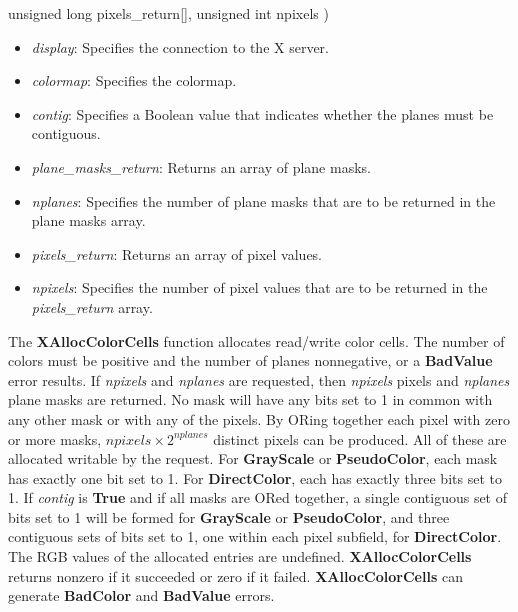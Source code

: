 \documentclass{report}
\begin{document}
\begin{itemize}
\begin{cppcode}
                    unsigned long pixels_return[],
                    unsigned int npixels
                )
            \end{cppcode}
            \bigbreak \noindent
            \begin{itemize}
                \item \textit{display}: Specifies the connection to the X server.
                \item \textit{colormap}: Specifies the colormap.
                \item \textit{contig}: Specifies a Boolean value that indicates whether the planes must be contiguous.
                \item \textit{plane\_masks\_return}: Returns an array of plane masks.
                \item \textit{nplanes}: Specifies the number of plane masks that are to be returned in the plane masks array.
                \item \textit{pixels\_return}: Returns an array of pixel values.
                \item \textit{npixels}: Specifies the number of pixel values that are to be returned in the \textit{pixels\_return} array.
            \end{itemize}
            \noindent
            The \textbf{XAllocColorCells} function allocates read/write color cells. The number of colors must be positive and the number of planes nonnegative, or a \textbf{BadValue} error results. If \textit{npixels} and \textit{nplanes} are requested, then \textit{npixels} pixels and \textit{nplanes} plane masks are returned. No mask will have any bits set to 1 in common with any other mask or with any of the pixels. By ORing together each pixel with zero or more masks, $\textit{npixels} \times 2^{\textit{nplanes}}$ distinct pixels can be produced. All of these are allocated writable by the request.
            \bigbreak \noindent
            For \textbf{GrayScale} or \textbf{PseudoColor}, each mask has exactly one bit set to 1. For \textbf{DirectColor}, each has exactly three bits set to 1. If \textit{contig} is \textbf{True} and if all masks are ORed together, a single contiguous set of bits set to 1 will be formed for \textbf{GrayScale} or \textbf{PseudoColor}, and three contiguous sets of bits set to 1, one within each pixel subfield, for \textbf{DirectColor}. The RGB values of the allocated entries are undefined. \textbf{XAllocColorCells} returns nonzero if it succeeded or zero if it failed.
            \bigbreak \noindent
            \textbf{XAllocColorCells} can generate \textbf{BadColor} and \textbf{BadValue} errors.

\end{itemize}
\end{document}
